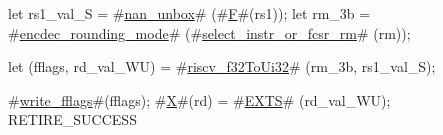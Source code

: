 let rs1_val_S = #\hyperref[sailRISCVznanzyunbox]{nan\_unbox}# (#\hyperref[sailRISCVzF]{F}#(rs1));
let rm_3b     = #\hyperref[sailRISCVzencdeczyroundingzymode]{encdec\_rounding\_mode}# (#\hyperref[sailRISCVzselectzyinstrzyorzyfcsrzyrm]{select\_instr\_or\_fcsr\_rm}#  (rm));

let (fflags, rd_val_WU) = #\hyperref[sailRISCVzriscvzyf32ToUi32]{riscv\_f32ToUi32}# (rm_3b, rs1_val_S);

#\hyperref[sailRISCVzwritezyfflags]{write\_fflags}#(fflags);
#\hyperref[sailRISCVzX]{X}#(rd) = #\hyperref[sailRISCVzEXTS]{EXTS}# (rd_val_WU);
RETIRE_SUCCESS
